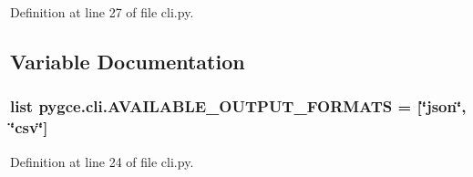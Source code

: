Definition at line 27 of file cli.\+py.



\subsection{Variable Documentation}
\subsubsection[{\texorpdfstring{A\+V\+A\+I\+L\+A\+B\+L\+E\+\_\+\+O\+U\+T\+P\+U\+T\+\_\+\+F\+O\+R\+M\+A\+TS}{AVAILABLE_OUTPUT_FORMATS}}]{\setlength{\rightskip}{0pt plus 5cm}list pygce.\+cli.\+A\+V\+A\+I\+L\+A\+B\+L\+E\+\_\+\+O\+U\+T\+P\+U\+T\+\_\+\+F\+O\+R\+M\+A\+TS = \mbox{[}\char`\"{}json\char`\"{}, \char`\"{}csv\char`\"{}\mbox{]}}\hypertarget{namespacepygce_1_1cli_a13e8047ab788ce64d94c1077ad4218e5}{}\label{namespacepygce_1_1cli_a13e8047ab788ce64d94c1077ad4218e5}


Definition at line 24 of file cli.\+py.


